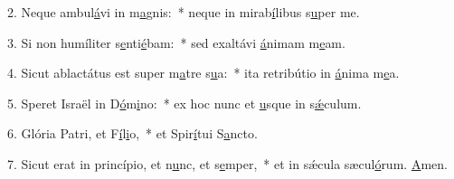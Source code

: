 2. Neque ambul\uline{á}vi in m\uline{a}gnis:~* neque in mirab\uline{í}libus s\uline{u}per me.\par 
3. Si non humíliter s\uline{e}nti\uline{é}bam:~* sed exaltávi \uline{á}nimam m\uline{e}am.\par 
4. Sicut ablactátus est super m\uline{a}tre s\uline{u}a:~* ita retribútio in \uline{á}nima m\uline{e}a.\par 
5. Speret Israël in D\uline{ó}m\uline{i}no:~* ex hoc nunc et \uline{u}sque in s\uline{ǽ}culum.\par 
6. Glória Patri, et F\uline{í}l\uline{i}o,~* et Spir\uline{í}tui S\uline{a}ncto.\par 
7. Sicut erat in princípio, et n\uline{u}nc, et s\uline{e}mper,~* et in sǽcula sæcul\uline{ó}rum. \uline{A}men.\par 
